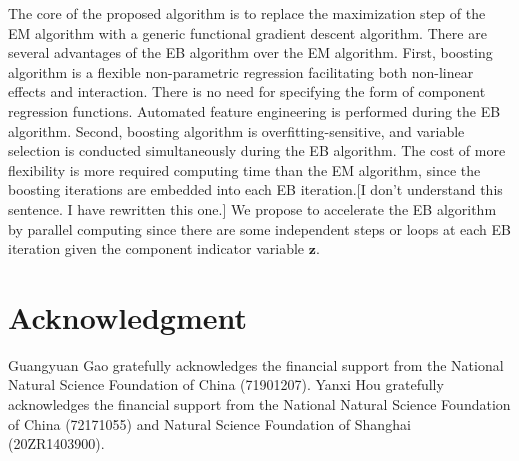 \documentclass[11pt]{article}
\numberwithin{equation}{section}
\def\bz{\boldsymbol{z}}
\begin{document}
The core of the proposed algorithm is to replace the maximization step of the EM algorithm with a generic functional gradient descent algorithm.
There are several advantages of the EB algorithm over the EM algorithm. 
First, boosting algorithm is a flexible non-parametric regression facilitating both {non-linear effects and interaction}.  
There is no need for specifying the form of component regression functions.
Automated feature engineering is performed during the EB algorithm.
Second, boosting algorithm is {overfitting-sensitive}, and {variable selection} is conducted simultaneously during the EB algorithm.
The cost of more flexibility is more required computing time than the EM algorithm, since the boosting iterations are embedded into each EB iteration.{\color{blue}[I don't understand this sentence. I have rewritten this one.]}
We propose to accelerate the EB algorithm by parallel computing since there are some independent steps or loops at each EB iteration given the component indicator variable $\bz$.

	\section*{Acknowledgment}
Guangyuan Gao gratefully acknowledges the financial support from the National Natural Science Foundation of China (71901207). Yanxi Hou gratefully acknowledges the financial support from the National Natural Science Foundation of China (72171055) and Natural Science Foundation of Shanghai (20ZR1403900).



\end{document}
